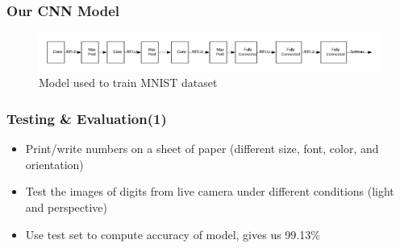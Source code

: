\documentclass[11.5pt,aspectratio=1610,xcolor={usenames,dvipsnames,table}]{beamer}
\begin{document}
\begin{frame}

\frametitle{Our CNN Model}


\begin{figure}[!h]
	\includegraphics[width=\textwidth]{images/cnn_model.png}
	\caption{Model used to train MNIST dataset }
	
\end{figure}


\end{frame}

%
%

\begin{frame}
\frametitle{Testing \& Evaluation(1)}

\begin{itemize}
	\item Print/write numbers on a sheet of paper (different size, font, color,  and orientation)
	\item Test the images of digits from live camera under different conditions (light and perspective)
	\item Use test set to compute accuracy of model, gives us 99.13\%
\end{itemize}
\end{frame}
\end{document}
